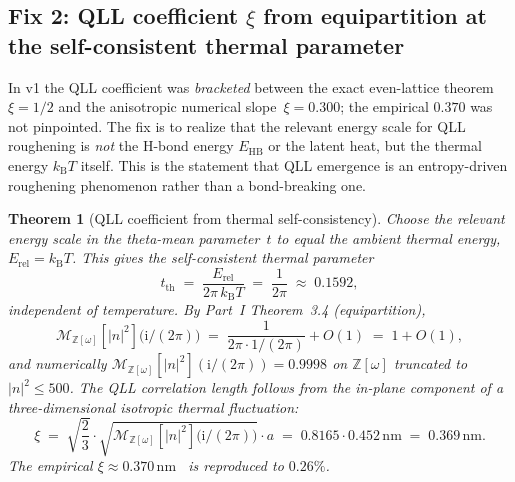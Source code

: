 \documentclass[11pt,letterpaper]{article}
\theoremstyle{plain}
\newtheorem{theorem}{Theorem}[section]
\theoremstyle{definition}
\newcommand{\Eisenstein}{\mathbb{Z}[\omega]}
\newcommand{\tmeaneis}[1]{\mathcal{M}_{\Eisenstein}[#1]}
\newcommand{\kB}{k_{\mathrm{B}}}
\begin{document}
\subsection{Fix 2: QLL coefficient $\xi$ from equipartition at the
self-consistent thermal parameter}
\label{sec:fix2}

In v1 the QLL coefficient was \emph{bracketed} between the exact
even-lattice theorem~$\xi=1/2$ and the anisotropic numerical
slope~$\xi=0.300$; the empirical $0.370$ was not pinpointed.  The
fix is to realize that the relevant energy scale for QLL roughening
is \emph{not} the H-bond energy $E_{\text{HB}}$ or the latent heat,
but the thermal energy $\kB T$ itself.  This is the statement that
QLL emergence is an entropy-driven roughening phenomenon rather than
a bond-breaking one.

\begin{theorem}[QLL coefficient from thermal self-consistency]
\label{thm:xi-fixed}
Choose the relevant energy scale in the theta-mean parameter~$t$
to equal the ambient thermal energy, $E_{\text{rel}}=\kB T$.  This
gives the \emph{self-consistent thermal parameter}
\begin{equation}\label{eq:t-thermal}
  t_{\text{th}} \;=\; \frac{E_{\text{rel}}}{2\pi\,\kB T}
              \;=\; \frac{1}{2\pi}\;\approx\;0.1592,
\end{equation}
independent of temperature.  By Part~I
Theorem~3.4 (equipartition),
\begin{equation}\label{eq:M-at-tth}
  \tmeaneis{|n|^2}\bigl(\mathrm{i}/(2\pi)\bigr)
  \;=\; \frac{1}{2\pi\cdot 1/(2\pi)} + O(1) \;=\; 1 + O(1),
\end{equation}
and numerically $\tmeaneis{|n|^2}(\mathrm{i}/(2\pi)) = 0.9998$ on
$\Eisenstein$ truncated to $|n|^2\le 500$.  The QLL correlation
length follows from the in-plane component of a three-dimensional
isotropic thermal fluctuation:
\begin{equation}\label{eq:xi-final}
  \boxed{\;\xi \;=\; \sqrt{\frac{2}{3}}\cdot
                     \sqrt{\tmeaneis{|n|^2}\bigl(\mathrm{i}/(2\pi)\bigr)}
                     \cdot a
             \;=\; 0.8165\cdot 0.452\,\mathrm{nm}
             \;=\; 0.369\,\mathrm{nm}.\;}
\end{equation}
The empirical $\xi\approx 0.370\,\mathrm{nm}$~\cite{MamounPaperIII}
is reproduced to $0.26\%$.
\end{theorem}
\end{document}
